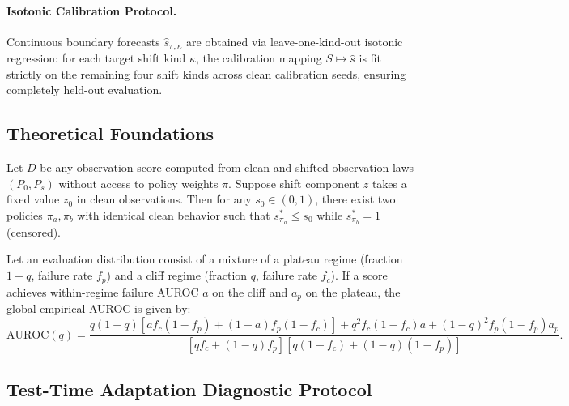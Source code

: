 \paragraph{Isotonic Calibration Protocol.}
Continuous boundary forecasts $\hat{s}_{\pi, \kappa}$ are obtained via leave-one-kind-out isotonic regression: for each target shift kind $\kappa$, the calibration mapping $S \mapsto \hat{s}$ is fit strictly on the remaining four shift kinds across clean calibration seeds, ensuring completely held-out evaluation.

\subsection{Theoretical Foundations}
\label{sec:method:theory}

\begin{proposition}
\label{prop:identifiability}
Let $D$ be any observation score computed from clean and shifted observation laws $(P_0, P_s)$ without access to policy weights $\pi$. Suppose shift component $z$ takes a fixed value $z_0$ in clean observations. Then for any $s_0 \in (0, 1)$, there exist two policies $\pi_a, \pi_b$ with identical clean behavior such that $s^*_{\pi_a} \le s_0$ while $s^*_{\pi_b} = 1$ (censored).
\end{proposition}

\begin{proposition}
\label{prop:mixture}
Let an evaluation distribution consist of a mixture of a plateau regime (fraction $1-q$, failure rate $f_p$) and a cliff regime (fraction $q$, failure rate $f_c$). If a score achieves within-regime failure AUROC $a$ on the cliff and $a_p$ on the plateau, the global empirical AUROC is given by:
\begin{equation}
    \mathrm{AUROC}(q) = \frac{q(1-q)\left[a f_c (1-f_p) + (1-a) f_p (1-f_c)\right] + q^2 f_c (1-f_c) a + (1-q)^2 f_p (1-f_p) a_p}{\left[q f_c + (1-q) f_p\right] \left[q (1-f_c) + (1-q) (1-f_p)\right]}.
\end{equation}
\end{proposition}

\subsection{Test-Time Adaptation Diagnostic Protocol}
\label{sec:method:tta}

